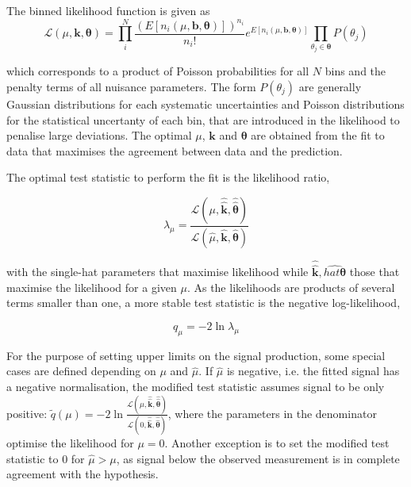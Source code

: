 The binned likelihood function is given as
\begin{equation}
    \mathscr{L}(\mu,\mathbf{k},\boldsymbol{\theta}) = \prod_i^N \frac{ (E[n_i(\mu,\mathbf{b},\boldsymbol{\theta})])^{n_i}}{n_i!}e^{E[n_i(\mu,\mathbf{b},\boldsymbol{\theta})]}\prod_{\theta_j\in\boldsymbol{\theta}}P(\theta_j)
\end{equation}

which corresponds to a product of Poisson probabilities for all $N$ bins and the penalty terms of all nuisance parameters. The form $P(\theta_j)$ are generally Gaussian distributions for each systematic uncertainties and Poisson distributions for the statistical uncertanty of each bin, that are introduced in the likelihood to penalise large deviations.
The optimal $\mu$, $\mathbf{k}$ and $\boldsymbol{\theta}$ are obtained from the fit to data that maximises the agreement between data and the prediction.

The optimal test statistic to perform the fit is the likelihood ratio, %

\begin{equation}
    \lambda_\mu = \frac{\mathscr{L}(\mu, \hat{\hat{\mathbf{k}}},\hat{\hat{\boldsymbol{\theta}}})}{\mathscr{L}(\hat{\mu}, \hat{\mathbf{k}},\hat{\boldsymbol{\theta}})}
\end{equation}

with the single-hat parameters that maximise likelihood while $\hat{\hat{\mathbf{k}}},\hat{hat{\boldsymbol{\theta}}}$ those that maximise the likelihood for a given $\mu$. As the likelihoods are products of several terms smaller than one, a more stable test statistic is the negative log-likelihood,

\begin{equation}
    q_\mu = -2\ln\lambda_\mu
\end{equation}

For the purpose of setting upper limits on the signal production, some special cases are defined depending on $\mu$ and $\hat{\mu}$. If $\hat{\mu}$ is negative, i.e. the fitted signal has a negative normalisation, the modified test statistic assumes signal to be only positive: $\tilde{q}(\mu)=-2\ln\frac{\mathscr{L}(\mu, \hat{\hat{\mathbf{k}}},\hat{\hat{\boldsymbol{\theta}}})}{\mathscr{L}(0, \hat{\hat{\mathbf{k}}},\hat{\hat{\boldsymbol{\theta}}})}$, where the parameters in the denominator optimise the likelihood for $\mu=0$. Another exception is to set the modified test statistic to 0 for $\hat{\mu}>\mu$, as signal below the observed measurement is in complete agreement with the hypothesis.

